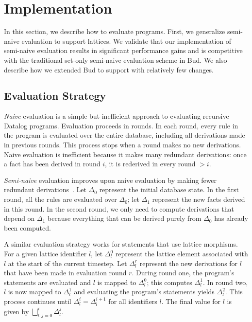 \section{Implementation}
\label{sec:impl}

In this section, we describe how to evaluate \lang programs. First, we
generalize semi-naive evaluation to support lattices. We validate that our
implementation of semi-naive evaluation results in significant performance gains
and is competitive with the traditional set-only semi-naive evaluation
scheme in Bud. We also describe how we extended Bud to support \lang
with relatively few changes.

\subsection{Evaluation Strategy}
\label{sec:lattice-eval-strat}
\emph{Naive} evaluation is a simple but inefficient approach to evaluating
recursive Datalog programs. Evaluation proceeds in rounds. In each round,
every rule in the program is evaluated over the entire database, including all
derivations made in previous rounds. This process stops when a round makes no
new derivations. Naive evaluation is inefficient because it makes many redundant
derivations: once a fact has been derived in round $i$, it is rederived in every
round $>i$.

\emph{Semi-naive} evaluation improves upon naive evaluation by making fewer
redundant derivations~\cite{Balbin1987}. Let $\Delta_0$ represent the initial
database state. In the first round, all the rules are evaluated over $\Delta_0$;
let $\Delta_1$ represent the new facts derived in this round. In the second
round, we only need to compute derivations that depend on $\Delta_1$ because
everything that can be derived purely from $\Delta_0$ has already been computed.

A similar evaluation strategy works for \lang statements that use lattice
morphisms. For a given lattice identifier $l$, let $\Delta_l^0$ represent the
lattice element associated with $l$ at the start of the current timestep. Let
$\Delta^r_l$ represent the new derivations for $l$ that have been made in
evaluation round $r$. During round one, the program's statements are evaluated
and $l$ is mapped to $\Delta_l^0$; this computes $\Delta^1_l$. In round two, $l$
is now mapped to $\Delta^1_l$ and evaluating the program's statements yields
$\Delta^2_l$. This process continues until $\Delta^i_l = \Delta^{i+1}_l$ for all
identifiers $l$.  The final value for $l$ is given by $\bigsqcup_{l: j=0}^i
\Delta^j_l$.

